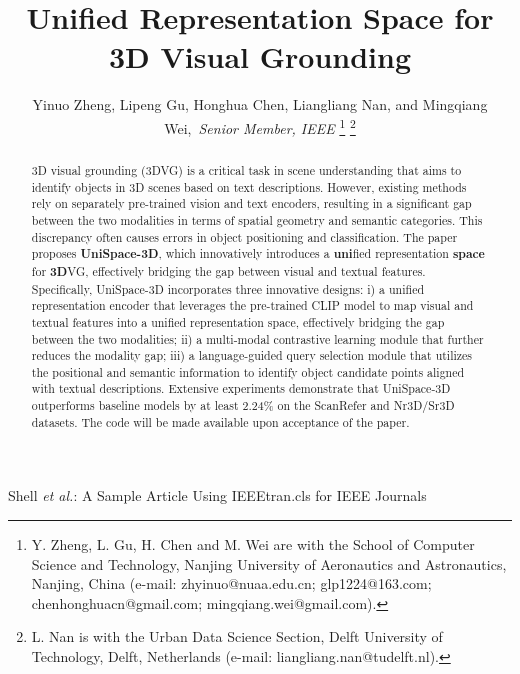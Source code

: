 \documentclass[lettersize,journal]{IEEEtran}
\begin{document}
\title{Unified Representation Space for 3D Visual Grounding}

\author{Yinuo Zheng, Lipeng Gu, Honghua Chen, Liangliang Nan, and Mingqiang Wei,~\textit{Senior Member, IEEE}
\thanks{Y. Zheng, L. Gu, H. Chen and M. Wei are with the School
of Computer Science and Technology, Nanjing University of Aeronautics
and Astronautics, Nanjing, China (e-mail: zhyinuo@nuaa.edu.cn; glp1224@163.com; chenhonghuacn@gmail.com; mingqiang.wei@gmail.com).}
\thanks{L. Nan is with the Urban Data Science Section, Delft University of Technology, Delft, Netherlands (e-mail: liangliang.nan@tudelft.nl).}
}

%
{Shell \MakeLowercase{\textit{et al.}}: A Sample Article Using IEEEtran.cls for IEEE Journals}


\maketitle

\begin{abstract}
    3D visual grounding (3DVG) is a critical task in scene understanding that aims to identify objects in 3D scenes based on text descriptions.
    However, existing methods rely on separately pre-trained vision and text encoders, resulting in a significant gap between the two modalities in terms of spatial geometry and semantic categories. This discrepancy often causes errors in object positioning and classification.
    The paper proposes \textbf{UniSpace-3D}, which innovatively introduces a \textbf{uni}fied representation \textbf{space} for \textbf{3D}VG, effectively bridging the gap between visual and textual features.
    Specifically, UniSpace-3D incorporates three innovative designs: 
    i) a unified representation encoder that leverages the pre-trained CLIP model to map visual and textual features into a unified representation space, effectively bridging the gap between the two modalities;
    ii) a multi-modal contrastive learning module that further reduces the modality gap;
    iii) a language-guided query selection module that utilizes the positional and semantic information to identify object candidate points aligned with textual descriptions. 
    Extensive experiments demonstrate that UniSpace-3D outperforms baseline models by at least 2.24\% on the ScanRefer and Nr3D/Sr3D datasets. The code will be made available upon acceptance of the paper.

\end{abstract}
\end{document}
